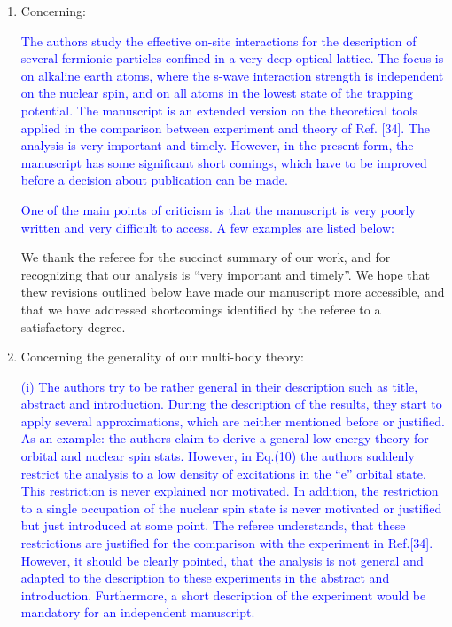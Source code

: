 \documentclass[preprint]{revtex4-1}
\newcommand{\1}{\mathds{1}}
\newcommand{\blue}[1]{\textcolor{blue}{#1}}
\begin{document}
\begin{enumerate}
\item Concerning:

  \blue{The authors study the effective on-site interactions for the
    description of several fermionic particles confined in a very deep
    optical lattice. The focus is on alkaline earth atoms, where the
    s-wave interaction strength is independent on the nuclear spin,
    and on all atoms in the lowest state of the trapping
    potential. The manuscript is an extended version on the
    theoretical tools applied in the comparison between experiment and
    theory of Ref. [34].  The analysis is very important and
    timely. However, in the present form, the manuscript has some
    significant short comings, which have to be improved before a
    decision about publication can be made.}

  \blue{One of the main points of criticism is that the manuscript is
    very poorly written and very difficult to access. A few examples
    are listed below:}

  We thank the referee for the succinct summary of our work, and for
  recognizing that our analysis is ``very important and timely''.  We
  hope that thew revisions outlined below have made our manuscript
  more accessible, and that we have addressed shortcomings identified
  by the referee to a satisfactory degree.


\item Concerning the generality of our multi-body theory:

  \blue{(i) The authors try to be rather general in their description
    such as title, abstract and introduction. During the description
    of the results, they start to apply several approximations, which
    are neither mentioned before or justified.  As an example: the
    authors claim to derive a general low energy theory for orbital
    and nuclear spin stats. However, in Eq.(10) the authors suddenly
    restrict the analysis to a low density of excitations in the ``e''
    orbital state. This restriction is never explained nor motivated.
    In addition, the restriction to a single occupation of the nuclear
    spin state is never motivated or justified but just introduced at
    some point. The referee understands, that these restrictions are
    justified for the comparison with the experiment in
    Ref.[34]. However, it should be clearly pointed, that the analysis
    is not general and adapted to the description to these experiments
    in the abstract and introduction. Furthermore, a short description
    of the experiment would be mandatory for an independent
    manuscript.}


\end{enumerate}
\end{document}
